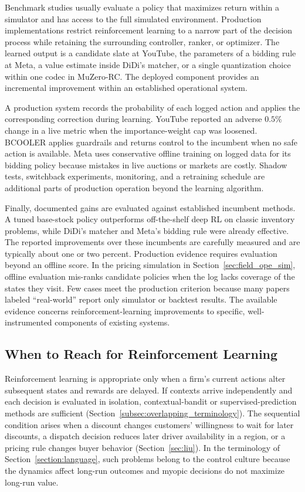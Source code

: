 Benchmark studies usually evaluate a policy that maximizes return within a simulator and has access to the full simulated environment. Production implementations restrict reinforcement learning to a narrow part of the decision process while retaining the surrounding controller, ranker, or optimizer. The learned output is a candidate slate at YouTube, the parameters of a bidding rule at Meta, a value estimate inside DiDi's matcher, or a single quantization choice within one codec in MuZero-RC. The deployed component provides an incremental improvement within an established operational system.

A production system records the probability of each logged action and applies the corresponding correction during learning. YouTube reported an adverse $0.5\%$ change in a live metric when the importance-weight cap was loosened. BCOOLER applies guardrails and returns control to the incumbent when no safe action is available. Meta uses conservative offline training on logged data for its bidding policy because mistakes in live auctions or markets are costly. Shadow tests, switchback experiments, monitoring, and a retraining schedule are additional parts of production operation beyond the learning algorithm.

Finally, documented gains are evaluated against established incumbent methods. A tuned base-stock policy outperforms off-the-shelf deep RL on classic inventory problems, while DiDi's matcher and Meta's bidding rule were already effective. The reported improvements over these incumbents are carefully measured and are typically about one or two percent. Production evidence requires evaluation beyond an offline score. In the pricing simulation in Section~\ref{sec:field_ope_sim}, offline evaluation mis-ranks candidate policies when the log lacks coverage of the states they visit. Few cases meet the production criterion because many papers labeled ``real-world'' report only simulator or backtest results. The available evidence concerns reinforcement-learning improvements to specific, well-instrumented components of existing systems.

\subsection{When to Reach for Reinforcement Learning}
\label{sec:field_practitioner}

Reinforcement learning is appropriate only when a firm's current actions alter subsequent states and rewards are delayed. If contexts arrive independently and each decision is evaluated in isolation, contextual-bandit or supervised-prediction methods are sufficient (Section~\ref{subsec:overlapping_terminology}). The sequential condition arises when a discount changes customers' willingness to wait for later discounts, a dispatch decision reduces later driver availability in a region, or a pricing rule changes buyer behavior (Section~\ref{sec:liu}). In the terminology of Section~\ref{section:language}, such problems belong to the control culture because the dynamics affect long-run outcomes and myopic decisions do not maximize long-run value.

